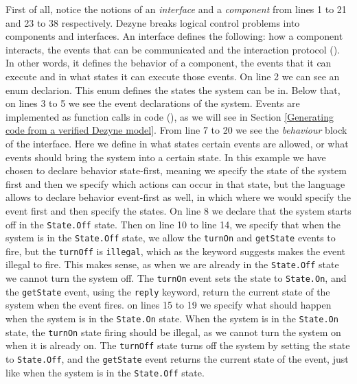 \documentclass[12pt]{scrreprt}
\begin{document}
First of all, notice the notions of an \textit{interface} and a \textit{component} from lines 1 to 21 and 23 to 38 respectively. Dezyne breaks logical control problems into components and interfaces. An interface defines the following: how a component interacts, the events that can be communicated and the interaction protocol (\cite{dzndoc}). In other words, it defines the behavior of a component, the events that it can execute and in what states it can execute those events. On line 2 we can see an enum declarion. This enum defines the states the system can be in. Below that, on lines 3 to 5 we see the event declarations of the system. Events are implemented as function calls in code (\cite{dzngloss}), as we will see in Section \ref{Generating code from a verified Dezyne model}. From line 7 to 20 we see the \textit{behaviour} block of the interface. Here we define in what states certain events are allowed, or what events should bring the system into a certain state. In this example we have chosen to declare behavior state-first, meaning we specify the state of the system first and then we specify which actions can occur in that state, but the language allows to declare behavior event-first as well, in which where we would specify the event first and then specify the states.
On line 8 we declare that the system starts off in the \texttt{State.Off} state. Then on line 10 to line 14, we specify that when the system is in the \texttt{State.Off} state, we allow the \texttt{turnOn} and \texttt{getState} events to fire, but the \texttt{turnOff} is \texttt{illegal}, which as the keyword suggests makes the event illegal to fire. This makes sense, as when we are already in the \texttt{State.Off} state we cannot turn the system off. The \texttt{turnOn} event sets the state to \texttt{State.On}, and the \texttt{getState} event, using the \texttt{reply} keyword, return the current state of the system when the event fires. on lines 15 to 19 we specify what should happen when the system is in the \texttt{State.On} state. When the system is in the \texttt{State.On} state, the \texttt{turnOn} state firing should be illegal, as we cannot turn the system on when it is already on. The \texttt{turnOff} state turns off the system by setting the state to \texttt{State.Off}, and the \texttt{getState} event returns the current state of the event, just like when the system is in the \texttt{State.Off} state.
\\\\
\end{document}
